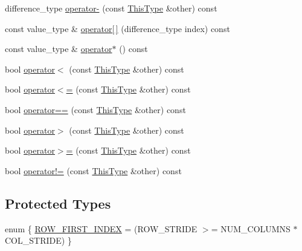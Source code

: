 \begin{DoxyCompactItemize}
\item 
difference\+\_\+type \hyperlink{classvct_fixed_stride_matrix_const_iterator_a44babcd63c37b91938861627b1e1e499}{operator-\/} (const \hyperlink{classvct_fixed_stride_matrix_const_iterator_a8c6ee7d655fb71d647506c3964a18e2c}{This\+Type} \&other) const 
\item 
const value\+\_\+type \& \hyperlink{classvct_fixed_stride_matrix_const_iterator_a2db82df75d7366f918ab32f2b4d28fc4}{operator\mbox{[}$\,$\mbox{]}} (difference\+\_\+type index) const 
\item 
const value\+\_\+type \& \hyperlink{classvct_fixed_stride_matrix_const_iterator_af79a4a3e90b5ff32a0c1ec1c7cbd7f9d}{operator$\ast$} () const 
\item 
bool \hyperlink{classvct_fixed_stride_matrix_const_iterator_a8e7df71e0b9cccdb29abbd135f253952}{operator$<$} (const \hyperlink{classvct_fixed_stride_matrix_const_iterator_a8c6ee7d655fb71d647506c3964a18e2c}{This\+Type} \&other) const 
\item 
bool \hyperlink{classvct_fixed_stride_matrix_const_iterator_ace3c857d9fcf35e574887f7d91565cab}{operator$<$=} (const \hyperlink{classvct_fixed_stride_matrix_const_iterator_a8c6ee7d655fb71d647506c3964a18e2c}{This\+Type} \&other) const 
\item 
bool \hyperlink{classvct_fixed_stride_matrix_const_iterator_a30720fc1aac7f4fa4303bb902d94fd5c}{operator==} (const \hyperlink{classvct_fixed_stride_matrix_const_iterator_a8c6ee7d655fb71d647506c3964a18e2c}{This\+Type} \&other) const 
\item 
bool \hyperlink{classvct_fixed_stride_matrix_const_iterator_a13d1e48d7d7d52c4cc05405cb0d01c9e}{operator$>$} (const \hyperlink{classvct_fixed_stride_matrix_const_iterator_a8c6ee7d655fb71d647506c3964a18e2c}{This\+Type} \&other) const 
\item 
bool \hyperlink{classvct_fixed_stride_matrix_const_iterator_a341561cf51af3633276865a544bcff70}{operator$>$=} (const \hyperlink{classvct_fixed_stride_matrix_const_iterator_a8c6ee7d655fb71d647506c3964a18e2c}{This\+Type} \&other) const 
\item 
bool \hyperlink{classvct_fixed_stride_matrix_const_iterator_a31551a9704867251d6fca5e369c63ab0}{operator!=} (const \hyperlink{classvct_fixed_stride_matrix_const_iterator_a8c6ee7d655fb71d647506c3964a18e2c}{This\+Type} \&other) const 
\end{DoxyCompactItemize}
\subsection*{Protected Types}
\begin{DoxyCompactItemize}
\item 
enum \{ \hyperlink{classvct_fixed_stride_matrix_const_iterator_a1ad91b24aad62d33ff762bd9e8cea3bcaa8508d448abd28db6d3a793f969deb27}{R\+O\+W\+\_\+\+F\+I\+R\+S\+T\+\_\+\+I\+N\+D\+E\+X} = (R\+O\+W\+\_\+\+S\+T\+R\+I\+D\+E $>$= N\+U\+M\+\_\+\+C\+O\+L\+U\+M\+N\+S $\ast$ C\+O\+L\+\_\+\+S\+T\+R\+I\+D\+E)
 \}
\end{DoxyCompactItemize}
